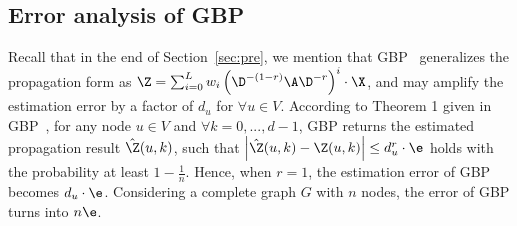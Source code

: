  

\subsection{Error analysis of GBP~\cite{chen2020GBP}}
Recall that in the end of Section~\ref{sec:pre}, we mention that GBP~\cite{chen2020GBP} generalizes the propagation form as $\Z=\sum_{i=0}^L w_i \left(\D^{-(1-r)}\A \D^{-r}\right)^i\cdot \X$, and may amplify the estimation error by a factor of $d_u$ for $\forall u\in V$. According to Theorem 1 given in GBP~\cite{chen2020GBP}, for any node $u\in V$ and $\forall k=0,...,d-1$, GBP returns the estimated propagation result $\hat{\Z}(u,k)$, such that $\left|\hat{\Z}(u,k)-\Z(u,k)\right|\le d_u^r \cdot \e$ holds with the probability at least $1-\frac{1}{n}$. Hence, when $r=1$, the estimation error of GBP becomes $d_u \cdot \e$. Considering a complete graph $G$ with $n$ nodes, the error of GBP turns into $n \e$. 



